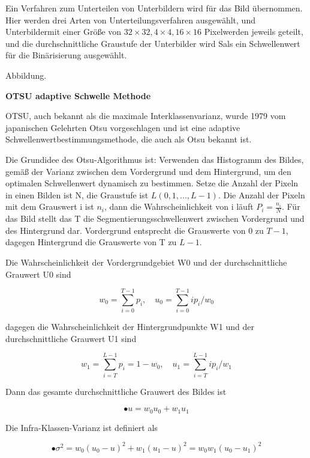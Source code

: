 Ein Verfahren zum Unterteilen von Unterbildern wird für das Bild übernommen. Hier werden drei Arten von Unterteilungsverfahren ausgewählt, und Unterbildermit einer Größe von $ 32\times32,4 \times4,16\times16 $ Pixelwerden jeweils geteilt, und die durchschnittliche Graustufe der Unterbilder wird Sals ein Schwellenwert für die Binärisierung ausgewählt.

Abbildung. 

\textbf{OTSU adaptive Schwelle Methode}

OTSU\cite{Ostu}, auch bekannt als die maximale Interklassenvarianz, wurde 1979 vom japanischen Gelehrten Otsu vorgeschlagen und ist eine adaptive Schwellenwertbestimmungsmethode, die auch als Otsu bekannt ist.

Die Grundidee des Otsu-Algorithmus ist: Verwenden das Histogramm des Bildes, gemäß der Varianz zwischen dem Vordergrund und dem Hintergrund, um den optimalen Schwellenwert dynamisch zu bestimmen. Setze die Anzahl der Pixeln in einen Bilden ist N, die Graustufe ist $ L(0,1,...,L-1) $. Die Anzahl der Pixeln mit dem Grauswert i ist $ n_{i} $, dann die Wahrscheinlichkeit von i läuft $ P_{i} = \frac{n_{i}}{N} $. Für das Bild stellt das T die Segmentierungsschwellenwert zwischen Vordergrund und des Hintergrund dar. Vordergrund entsprecht die Grauswerte von 0 zu $ T-1 $, dagegen Hintergrund die Grauswerte von T zu $ L -1 $.

Die Wahrscheinlichkeit der Vordergrundgebiet W0 und der durchschnittliche Grauwert U0 sind

\begin{equation}
  w_{0} = \sum_{i=0}^{T-1} p_{i},\quad u_{0} = \sum_{i=0}^{T-1} ip_{i}/w_{0}
\end{equation}

dagegen die Wahrscheinlichkeit der Hintergrundpunkte W1 und der durchschnittliche Grauwert U1 sind

\begin{equation}
  w_{1} = \sum_{i=T}^{L-1} p_{i} = 1-w_{0},\quad u_{1} = \sum_{i=T}^{L-1} ip_{i}/w_{1}
\end{equation}

Dann das gesamte durchschnittliche Grauwert des Bildes ist

\begin{equation}
• u = w_{0}u_{0} + w_{1}u_{1}
\end{equation}

Die Infra-Klassen-Varianz ist definiert als

\begin{equation}
•\sigma^2 = w_{0}(u_{0} - u)^2 + w_{1}(u_{1} - u)^2 = w_{0}w_{1}(u_{0} - u_{1})^2
\end{equation}

